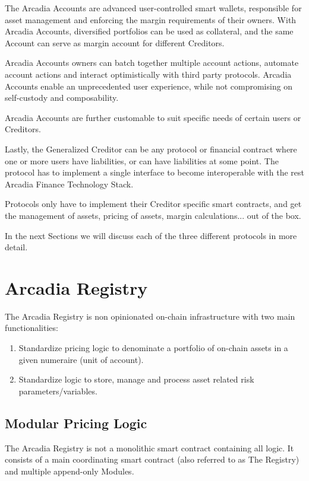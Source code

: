 \documentclass[sigconf,nonacm]{acmart}
\begin{document}
The Arcadia Accounts are advanced user-controlled smart wallets, responsible for asset management and enforcing the margin requirements of their owners.
With Arcadia Accounts, diversified portfolios can be used as collateral, and the same Account can serve as margin account for different Creditors.

Arcadia Accounts owners can batch together multiple account actions, automate account actions and interact optimistically with third party protocols.
Arcadia Accounts enable an unprecedented user experience, while not compromising on self-custody and composability.

Arcadia Accounts are further customable to suit specific needs of certain users or Creditors.

Lastly, the Generalized Creditor can be any protocol or financial contract where one or more users have liabilities, or can have liabilities at some point.
The protocol has to implement a single interface to become interoperable with the rest Arcadia Finance Technology Stack.

Protocols only have to implement their Creditor specific smart contracts,
and get the management of assets, pricing of assets, margin calculations... out of the box.

In the next Sections we will discuss each of the three different protocols in more detail.

\section{Arcadia Registry}
\label{sec:arcadia-registry}

The Arcadia Registry is non opinionated on-chain infrastructure with two main functionalities:
\begin{enumerate}
    \item Standardize pricing logic to denominate a portfolio of on-chain assets in a given numeraire (unit of account).
    \item Standardize logic to store, manage and process asset related risk parameters/variables.
\end{enumerate}

\subsection{Modular Pricing Logic}
\label{subsec:modular-pricing-logic}
The Arcadia Registry is not a monolithic smart contract containing all logic.
It consists of a main coordinating smart contract (also referred to as The Registry) and multiple append-only Modules.
\end{document}
